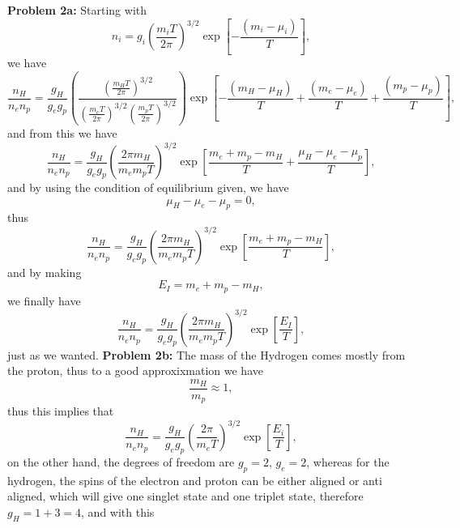 \documentclass[11pt]{article}
\begin{document}
\newpage
\textbf{Problem 2a:}
 Starting with
\begin{displaymath}
  n_i = g_i\left(\frac{m_i T}{2\pi}\right)^{3/2} \exp\left[ -\frac{(m_i -\mu_i)}{T}\right],
\end{displaymath}
we have
\begin{displaymath}
  \frac{n_H}{n_e n_p} = \frac{g_H}{g_e g_p}\left( \frac{\left(\frac{m_H T}{2\pi}\right)^{3/2} }{\left(\frac{m_e T}{2\pi}\right)^{3/2} \left(\frac{m_p T}{2\pi}\right)^{3/2} }\right)\exp\left[ -\frac{(m_H -\mu_H)}{T} +\frac{(m_e -\mu_e)}{T}+\frac{(m_p -\mu_p)}{T} \right],
\end{displaymath}
and from this we have
\begin{displaymath}
  \frac{n_H}{n_e n_p} = \frac{g_H}{g_e g_p} \left(\frac{2\pi m_H}{m_e m_p T}\right)^{3/2} \exp\left[ \frac{m_e + m_p - m_H}{T} + \frac{\mu_H - \mu_e - \mu_p}{T}\right],
\end{displaymath}
and by using the condition of equilibrium given, we have 
\begin{displaymath}
  \mu_H - \mu_e - \mu_p =0,
\end{displaymath}
thus
\begin{displaymath}
  \frac{n_H}{n_e n_p} = \frac{g_H}{g_e g_p} \left(\frac{2\pi m_H}{m_e m_p T}\right)^{3/2} \exp\left[ \frac{m_e + m_p - m_H}{T}\right],
\end{displaymath}
and by making
\begin{displaymath}
  E_I = m_e + m_p - m_H,
\end{displaymath}
we finally have
\begin{displaymath}
  \frac{n_H}{n_e n_p} = \frac{g_H}{g_e g_p} \left(\frac{2\pi m_H}{m_e m_p T}\right)^{3/2} \exp\left[ \frac{E_I}{T}\right],
\end{displaymath}
just as we wanted.
\newline
\textbf{Problem 2b:}
The mass of the Hydrogen comes mostly from the proton, thus to a good approxixmation we have
\begin{displaymath}
  \frac{m_H}{m_p}\approx 1,
\end{displaymath}
thus this implies that
\begin{displaymath}
  \frac{n_H}{n_e n_p} = \frac{g_H}{g_e g_p} \left(\frac{2\pi }{m_e T}\right)^{3/2} \exp\left[ \frac{E_i}{T}\right],
\end{displaymath}
on the other hand, the degrees of freedom are $g_p=2$, $g_e=2$, whereas for the hydrogen, the spins of the electron and proton can be either aligned or anti aligned, which will give one singlet state and one triplet state, therefore $g_H = 1+3 =4$, and with this
\end{document}
